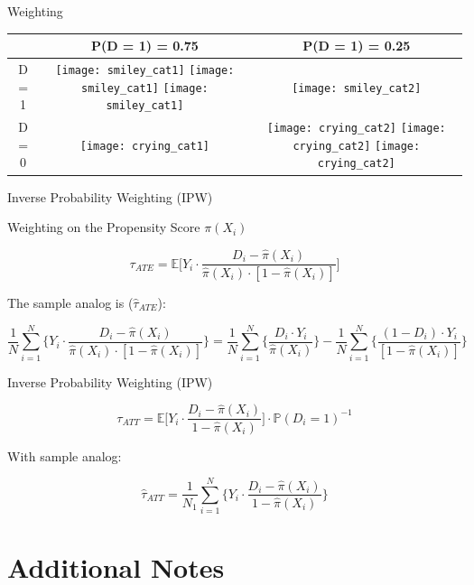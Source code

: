 \documentclass[ignorenonframetext,]{beamer}
\begin{document}
\begin{frame}{Weighting}


\begin{center}
 \begin{tabular}{||c c c ||} 
 \hline
 & P(D = 1) = 0.75 & P(D = 1) = 0.25\\ [0.5ex] 
 \hline\hline
 D = 1 & \texttt{[image: smiley\_cat1]} \texttt{[image: smiley\_cat1]} \texttt{[image: smiley\_cat1]} &  \texttt{[image: smiley\_cat2]}\\ 
 \hline
 D = 0 & \texttt{[image: crying\_cat1]} & \texttt{[image: crying\_cat2]} \texttt{[image: crying\_cat2]} \texttt{[image: crying\_cat2]}\\
 \hline
\end{tabular}
\end{center}

\end{frame}

\begin{frame}{Inverse Probability Weighting (IPW)}

Weighting on the Propensity Score \(\pi(X_i)\)

\[\tau_{ATE} = \mathbb{E}\Big[Y_i \cdot \frac{D_i - \hat{\pi}(X_i) }{\hat{\pi}(X_i)\cdot[1-\hat{\pi}(X_i)]}\Big]\]

The sample analog is (\(\hat{\tau}_{ATE}\)):

\[\frac{1}{N} \sum_{i=1}^{N} \Big\{ Y_i \cdot \frac{D_i - \hat{\pi}(X_i) }{\hat{\pi}(X_i)\cdot[1-\hat{\pi}(X_i)]}  \Big\} = \frac{1}{N} \sum_{i=1}^{N} \Big\{ \frac{D_i \cdot Y_i }{\hat{\pi}(X_i)} \Big\} -  \frac{1}{N} \sum_{i=1}^{N} \Big\{ \frac{(1 - D_i) \cdot Y_i}{[1-\hat{\pi}(X_i)]}  \Big\}\]

\end{frame}

\begin{frame}{Inverse Probability Weighting (IPW)}

\[\tau_{ATT} = \mathbb{E}\Big[Y_i \cdot \frac{D_i - \hat{\pi}(X_i) }{1-\hat{\pi}(X_i)}\Big] \cdot \mathbb{P}(D_i =1)^{-1}\]

With sample analog:

\[\hat{\tau}_{ATT} = \dfrac{1}{N_1} \sum_{i=1}^{N} \Big\{ Y_i \cdot \frac{D_i - \hat{\pi}(X_i) }{1-\hat{\pi}(X_i)}  \Big\}\]

\end{frame}

\section{Additional Notes}\label{additional-notes}
\end{document}
